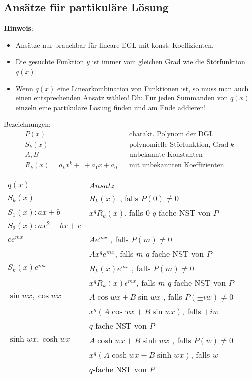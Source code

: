 \subsection{Ansätze für partikuläre Lösung}
\label{sec:ansatz-dgl}
	\textbf{Hinweis}:
	\begin{itemize}
		\item Ansätze nur brauchbar für lineare DGL mit konst. Koeffizienten.

		\item Die gesuchte Funktion $y$ ist immer vom gleichen Grad wie die Störfunktion $q(x)$.

		\item Wenn $q(x)$ eine Linearkombination von Funktionen ist, so muss man auch einen entsprechenden Ansatz wählen! Dh: Für jeden Summanden von $q(x)$ einzeln eine partikuläre Lösung finden und am Ende addieren!
	\end{itemize}
	Bezeichnungen:
	\begin{align*}
	P(x)  &  \quad \text{charakt. Polynom der DGL}  \\
	S_k(x) & \quad \text{polynomielle Störfunktion, Grad} \; k \\
	A, B & \quad \text{unbekannte Konstanten} \\
	R_k(x) = a_k x^k + . + a_1 x + a_0 & \quad \text{mit unbekannten Koeffizienten}
	\end{align*}
		
	\begin{tabular}{l|l}
		$q(x)$ & $Ansatz$ \\ \hline \hline
		
		$ S_k(x) $ & $R_k(x)$ , falls $P(0) \neq 0$\\
		\small{$S_1(x): ax + b$} &  $x^q R_k(x)$, falls $0$ $q$-fache NST von $P$ \\ 
		\small{$S_2(x): ax^2 + bx + c$} & \\ \hline

		$ c e^{mx} $  & $A e^{mx}$ , falls $P(m) \neq 0$\\ 
		&  $A x^q e^{mx}$, falls $m$ $q$-fache NST von $P$ \\ \hline

		$ S_k(x) e^{mx} $  & $R_k(x) e^{mx}$ , falls $P(m) \neq 0$\\
		&  $x^q R_k(x) e^{mx}$, falls $m$ $q$-fache NST von $P$ \\ \hline
		$ \sin wx, \cos wx $  & $A \cos wx + B \sin wx$ , falls $P(\pm iw) \neq 0$\\
		&  $x^q (A \cos wx + B \sin wx)$, falls $\pm iw$ \\
		& $q$-fache NST von $P$ \\ \hline
		$ \sinh wx, \cosh wx $  & $A \cosh wx + B \sinh wx$ , falls $P(w) \neq 0$\\
		&  $x^q (A \cosh wx + B \sinh wx)$, falls $w$ \\
		& $q$-fache NST von $P$ \\
	\end{tabular}

